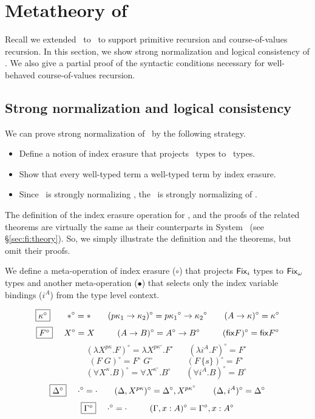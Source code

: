 \section{Metatheory of \Fixi} \label{sec:fixi:theory}
Recall we extended \Fixw\ to \Fixi\ to support primitive recursion and
course-of-values recursion. In this section, we show strong normalization and
logical consistency of \Fixi. We also give a partial proof of
the syntactic conditions necessary for well-behaved course-of-values recursion.

\subsection{Strong normalization and logical consistency}
\label{ssec:fixi:theory:sn}
We can prove strong normalization of \Fixi\ by the following strategy.
\begin{itemize}
\item Define a notion of index erasure that
	projects \Fixi\ types to \Fixw\ types.
\item Show that every well-typed \Fixi term a well-typed \Fixw term
	by index erasure.
\item Since \Fixw\ is strongly normalizing \cite{AbeMat04}, the
	\Fixi\ is strongly normalizing of \Fixi.
\end{itemize}

The definition of the index erasure operation for \Fixi, and the proofs of
the related theorems are virtually the same as their counterparts
in System \Fi\ (see \S\ref{sec:fi:theory}). So, we simply illustrate
the definition and the theorems, but omit their proofs.

We define a meta-operation of index erasure ($\circ$) that
projects $\Fixi$ types to $\Fixw$ types and another meta-operation ($\bullet$)
that selects only the index variable bindings ($i^A$) from
the type level context.
\begin{definition}\label{def:Fixierase}
\[ \fbox{$\kappa^\circ$}
 ~~~~ ~~
 *^\circ =
 *
 ~~~~ ~~
 (p\kappa_1 -> \kappa_2)^\circ =
 p{\kappa_1}^\circ -> {\kappa_2}^\circ
 ~~~~ ~~
 (A -> \kappa)^\circ =
 \kappa^\circ
\]
\[ \fbox{$F^\circ$}
 ~~~~
 X^\circ =
 X
 ~~~~ ~~~~
 (A -> B)^\circ =
 A^\circ -> B^\circ
 ~~~~ ~~~~
 (\mathsf{fix} F)^\circ =
 \mathsf{fix} F^\circ
\]
\[ \qquad
 (\lambda X^{p\kappa}.F)^\circ =
 \lambda X^{p\kappa^\circ}.F^\circ
 ~~~~ ~~~~
 (\lambda i^A.F)^\circ =
 F^\circ
\]
\[ \qquad
 (F\;G)^\circ =
 F^\circ\;G^\circ
 ~~~~ ~~~~ ~~~~ ~~~~ ~~
 (F\,\{s\})^\circ =
 F^\circ
\]
\[ \qquad
 (\forall X^\kappa . B)^\circ =
 \forall X^{\kappa^\circ} . B^\circ
 ~~~~ ~~~~
 (\forall i^A . B)^\circ =
 B^\circ
\]
\[ \fbox{$\Delta^\circ$}
 ~~~~
 \cdot^\circ = \cdot
 ~~~~ ~~
 (\Delta,X^{p\kappa})^\circ = \Delta^\circ,X^{p\kappa^\circ}
 ~~~~ ~~
 (\Delta,i^A)^\circ = \Delta^\circ
\]
\[ \fbox{$\Gamma^\circ$}
 ~~~~
 \cdot^\circ = \cdot
 ~~~~ ~~~~
 (\Gamma,x:A)^\circ = \Gamma^\circ,x:A^\circ
\]
\end{definition}

